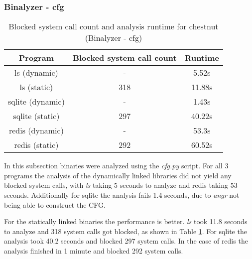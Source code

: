 \subsubsection {Binalyzer - cfg}
\begin{table}[!h]
\begin{center}
\caption{Blocked system call count and analysis runtime for chestnut (Binalyzer - cfg)}
\label{tbl:chestnut_bin_cfg_results}
\begin{tabular}{||c c c||} 
 \hline
 Program & Blocked system call count & Runtime \\
 \hline\hline
 ls (dynamic) & - & 5.52s \\ 
 \hline
 ls (static) & 318 & 11.88s \\ 
 \hline
 sqlite (dynamic) & - & 1.43s \\ 
 \hline
 sqlite (static) & 297 & 40.22s \\ 
 \hline
 redis (dynamic) & - & 53.3s \\ 
 \hline
 redis (static) & 292 & 60.52s \\ 
 \hline
\end{tabular}
\end{center}
\end{table}
In this subsection binaries were analyzed using the \textit{cfg.py} script.
For all 3 programs the analysis of the dynamically linked libraries did not yield any blocked system calls, with \textit{ls} taking 5 seconds to analyze and redis taking 53 seconds. Additionally for sqlite the analysis fails 1.4 seconds, due to \textit{angr} not being able to construct the CFG.

For the statically linked binaries the performance is better.
\textit{ls} took 11.8 seconds to analyze and 318 system calls got blocked, as shown in Table \ref{tbl:chestnut_bin_cfg_results}.
For sqlite the analysis took 40.2 seconds and blocked 297 system calls.
In the case of redis the analysis finished in 1 minute and blocked 292 system calls.
